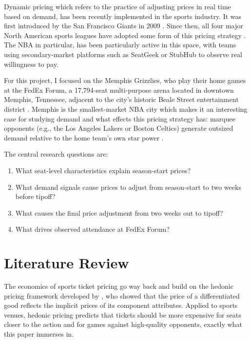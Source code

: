 \documentclass[12pt]{article}
\begin{document}
Dynamic pricing which refers to the practice of adjusting prices in real time based on demand, has been recently implemented in the sports industry. It was first introduced by the San Francisco Giants in 2009 \citep{drayer2012dynamic}. Since then, all four major North American sports leagues have adopted some form of this pricing strategy \citep{paul2013determinants}. The NBA in particular, has been particularly active in this space, with teams using secondary-market platforms such as SeatGeek or StubHub to observe real willingness to pay.
 
For this project, I focused on the Memphis Grizzlies, who play their home games at the FedEx Forum, a 17,794-seat multi-purpose arena located in downtown Memphis, Tennessee, adjacent to the city's historic Beale Street entertainment district \citep{fedexforum2024about}. Memphis is the smallest-market NBA city which makes it an interesting case for studying demand and what effects this pricing strategy has: marquee opponents (e.g., the Los Angeles Lakers or Boston Celtics) generate outsized demand relative to the home team's own star power \citep{grizzlies2024nba}.
 
The central research questions are:
\begin{enumerate}
    \item What seat-level characteristics explain season-start prices?
    \item What demand signals cause prices to adjust from season-start to two weeks before tipoff?
    \item What causes the final price adjustment from two weeks out to tipoff?
    \item What drives observed attendance at FedEx Forum?
\end{enumerate}
 
 
\section{Literature Review}
\label{sec:litreview}
 
The economics of sports ticket pricing go way back and build on the hedonic pricing framework developed by \citet{rosen1974hedonic}, who showed that the price of a differentiated good reflects the implicit prices of its component attributes. Applied to sports venues, hedonic pricing predicts that tickets should be more expensive for seats closer to the action and for games against high-quality opponents, exactly what this paper immerses in.
 
\end{document}
